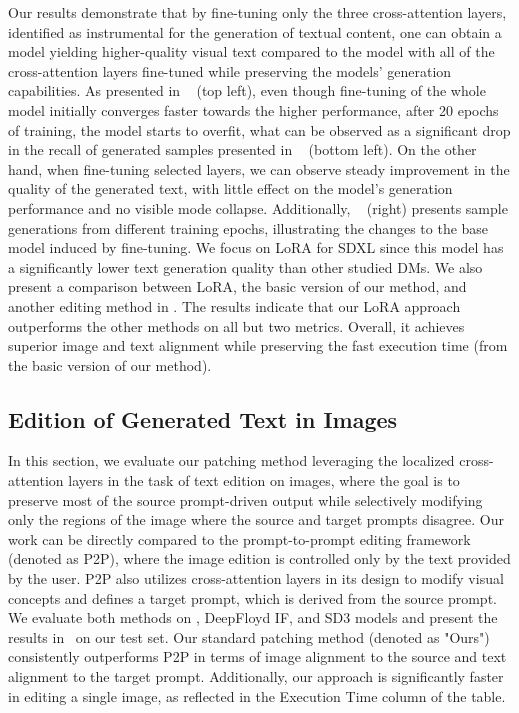 Our results demonstrate that by fine-tuning only the three cross-attention layers, identified as instrumental for the generation of textual content, one can obtain a model yielding higher-quality visual text compared to the model with all of the cross-attention layers fine-tuned while preserving the models' generation capabilities. As presented in ~ (top left), even though fine-tuning of the whole model initially converges faster towards the higher performance, after 20 epochs of training, the model starts to overfit, what can be observed as a significant drop in the recall of generated samples presented in ~ (bottom left). On the other hand, when fine-tuning selected layers, we can observe steady improvement in the quality of the generated text, with little effect on the model's generation performance and no visible mode collapse. Additionally, ~ (right) presents sample generations from different training epochs, illustrating the changes to the base model induced by fine-tuning.
We focus on LoRA for SDXL since this model has a significantly lower text generation quality than other studied DMs. We also present a comparison between LoRA, the basic version of our method, and another editing method in . The results indicate that our LoRA approach outperforms the other methods on all but two metrics. Overall, it achieves superior image and text alignment while preserving the fast execution time (from the basic version of our method).













\subsection{Edition of Generated Text in Images}
In this section, we evaluate our patching method leveraging the localized cross-attention layers in the task of text edition on images, where the goal is to preserve most of the source prompt-driven output while selectively modifying only the regions of the image where the source and target prompts disagree.
Our work can be directly compared to the prompt-to-prompt editing framework ~\citep{hertz2023prompttoprompt} (denoted as P2P), where the image edition is controlled only by the text provided by the user. P2P also utilizes cross-attention layers in its design to modify visual concepts and defines a target prompt, which is derived from the source prompt. We evaluate both methods on \SDXL, DeepFloyd IF, and SD3 models and present the results in~ on our test set. Our standard patching method (denoted as "Ours") consistently outperforms P2P in terms of image alignment to the source and text alignment to the target prompt. Additionally, our approach is significantly faster in editing a single image, as reflected in the Execution Time column of the table.

